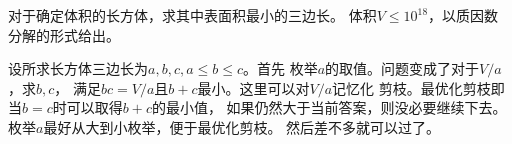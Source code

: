 \begin{prob}
	对于确定体积的长方体，求其中表面积最小的三边长。
	体积$V \le 10^{18}$，以质因数分解的形式给出。
\end{prob}

\begin{sol}
	设所求长方体三边长为$a,b,c,a \le b \le c$。首先
	枚举$a$的取值。问题变成了对于$V/a$，求$b,c$，
	满足$bc = V/a$且$b+c$最小。这里可以对$V/a$记忆化
	剪枝。最优化剪枝即当$b=c$时可以取得$b+c$的最小值，
	如果仍然大于当前答案，则没必要继续下去。
	枚举$a$最好从大到小枚举，便于最优化剪枝。
	然后差不多就可以过了。
\end{sol}
